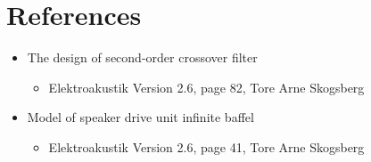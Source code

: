 \section{References}
\begin{itemize}
	\item The design of second-order crossover filter
	\begin{itemize}
		\item Elektroakustik Version 2.6, page 82, Tore Arne Skogsberg
	\end{itemize}
	\item Model of speaker drive unit infinite baffel
	\begin{itemize}
		\item Elektroakustik Version 2.6, page 41, Tore Arne Skogsberg
	\end{itemize}
\end{itemize}



\FloatBarrier
